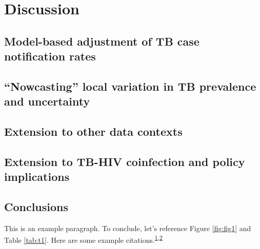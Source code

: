 \documentclass[
]{article}
\begin{document}
\lipsum[11-13]

\hypertarget{discussion}{%
\section{Discussion}\label{discussion}}

\lipsum[14-15]

\hypertarget{model-based-adjustment-of-tb-case-notification-rates}{%
\subsection{Model-based adjustment of TB case notification rates}\label{model-based-adjustment-of-tb-case-notification-rates}}

\lipsum[1-6]

\hypertarget{nowcasting-local-variation-in-tb-prevalence-and-uncertainty}{%
\subsection{``Nowcasting'' local variation in TB prevalence and uncertainty}\label{nowcasting-local-variation-in-tb-prevalence-and-uncertainty}}

\lipsum[7-8]

\hypertarget{extension-to-other-data-contexts}{%
\subsection{Extension to other data contexts}\label{extension-to-other-data-contexts}}

\lipsum[9-11]

\hypertarget{extension-to-tb-hiv-coinfection-and-policy-implications}{%
\subsection{Extension to TB-HIV coinfection and policy implications}\label{extension-to-tb-hiv-coinfection-and-policy-implications}}

\lipsum[12-15]

\hypertarget{conclusions}{%
\subsection{Conclusions}\label{conclusions}}

\lipsum[1]

This is an example paragraph. To conclude, let's reference Figure \ref{fig:fig1} and Table \ref{tab:t1}. Here are some example citations.\textsuperscript{\protect\hyperlink{ref-Aalbers}{1},\protect\hyperlink{ref-Aguirre2009}{2}}
\end{document}
